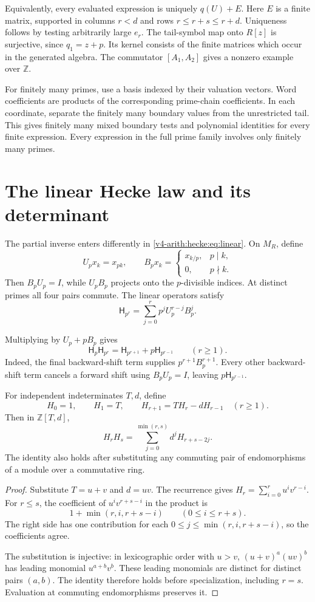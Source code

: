 Equivalently, every evaluated expression is uniquely $q(U)+E$.
Here $E$ is a finite matrix, supported in columns $r<d$ and rows
$r\leq r+s\leq r+d$. Uniqueness follows by testing arbitrarily
large $e_r$. The tail-symbol map onto $R[z]$ is surjective,
since $q_1=z+p$. Its kernel consists of the finite matrices
which occur in the generated algebra.
The commutator $[A_1,A_2]$ gives a nonzero example over $\mathbb Z$.

For finitely many primes, use a basis indexed by their valuation vectors.
Word coefficients are products of the corresponding prime-chain coefficients.
In each coordinate, separate the finitely many boundary values from
the unrestricted tail. This gives finitely many mixed boundary tests
and polynomial identities for every finite expression.
Every expression in the full prime family involves only finitely many primes.

\section{The linear Hecke law and its determinant}
\label{v4-arith:hecke:sec:linear}

The partial inverse enters differently in
\eqref{v4-arith:hecke:eq:linear}. On $M_R$, define
\[
 U_px_k=x_{pk},\qquad
 B_px_k=\begin{cases}x_{k/p},&p\mid k,\\0,&p\nmid k.\end{cases}
\]
Then $B_pU_p=I$, while $U_pB_p$ projects onto the
$p$-divisible indices. At distinct primes all four pairs commute.
The linear operators satisfy
\[
 \mathsf H_{p^r}=\sum_{j=0}^rp^jU_p^{r-j}B_p^j.
\]

Multiplying by $U_p+pB_p$ gives
\[
 \mathsf H_p\mathsf H_{p^r}
 =\mathsf H_{p^{r+1}}+p\mathsf H_{p^{r-1}}
 \qquad(r\geq1).
\]
Indeed, the final backward-shift term supplies $p^{r+1}B_p^{r+1}$.
Every other backward-shift term cancels a forward shift using
$B_pU_p=I$, leaving $p\mathsf H_{p^{r-1}}$.

\begin{proposition}
\label{v4-arith:hecke:prop:determinant}
For independent indeterminates $T,d$, define
\[
 H_0=1,\qquad H_1=T,\qquad H_{r+1}=TH_r-dH_{r-1}\quad(r\geq1).
\]
Then in $\mathbb Z[T,d]$,
\[
 H_rH_s=\sum_{j=0}^{\min(r,s)}d^jH_{r+s-2j}.
\]
The identity also holds after substituting any commuting pair of
endomorphisms of a module over a commutative ring.
\end{proposition}
\begin{proof}
Substitute $T=u+v$ and $d=uv$.
The recurrence gives $H_r=\sum_{i=0}^ru^iv^{r-i}$.
For $r\leq s$, the coefficient of $u^iv^{r+s-i}$ in the product is
\[
 1+\min(r,i,r+s-i)\qquad(0\leq i\leq r+s).
\]
The right side has one contribution for each
$0\leq j\leq\min(r,i,r+s-i)$, so the coefficients agree.

The substitution is injective: in lexicographic order with $u>v$,
$(u+v)^a(uv)^b$ has leading monomial $u^{a+b}v^b$.
These leading monomials are distinct for distinct pairs $(a,b)$.
The identity therefore holds before specialization, including $r=s$.
Evaluation at commuting endomorphisms preserves it.
\end{proof}

